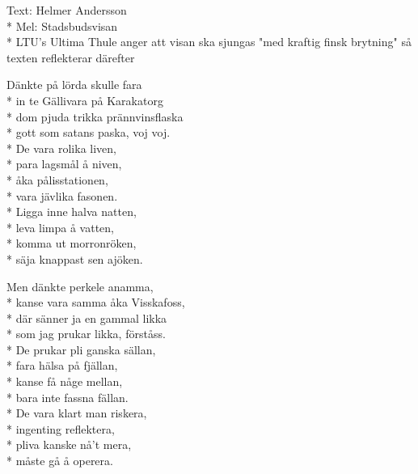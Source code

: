 \begin{SongText}[Gällivarevisan]
    \begin{SongInfo}
        Text: Helmer Andersson\\*%
        Mel:  Stadsbudsvisan\\*%
        LTU's Ultima Thule anger att visan ska sjungas "med kraftig finsk brytning" så texten reflekterar därefter
    \end{SongInfo}
    \begin{SongVerse}
        Dänkte på lörda skulle fara\\*%
        in te Gällivara på Karakatorg\\*%
        dom pjuda trikka prännvinsflaska\\*%
        gott som satans paska, voj voj.\\*%
        De vara rolika liven,\\*%
        para lagsmål å niven,\\*%
        åka pålisstationen,\\*%
        vara jävlika fasonen.\\*%
        Ligga inne halva natten,\\*%
        leva limpa å vatten,\\*%
        komma ut morronröken,\\*%
        säja knappast sen ajöken.
    \end{SongVerse}
    \begin{SongVerse}
        Men dänkte perkele anamma,\\*%
        kanse vara samma åka Visskafoss,\\*%
        där sänner ja en gammal likka\\*%
        som jag prukar likka, förståss.\\*%
        De prukar pli ganska sällan,\\*%
        fara hälsa på fjällan,\\*%
        kanse få någe mellan,\\*%
        bara inte fassna fällan.\\*%
        De vara klart man riskera,\\*%
        ingenting reflektera,\\*%
        pliva kanske nå’t mera,\\*%
        måste gå å operera.
    \end{SongVerse}
    \begin{SongVerse}

\end{SongVerse}
\end{SongText}
